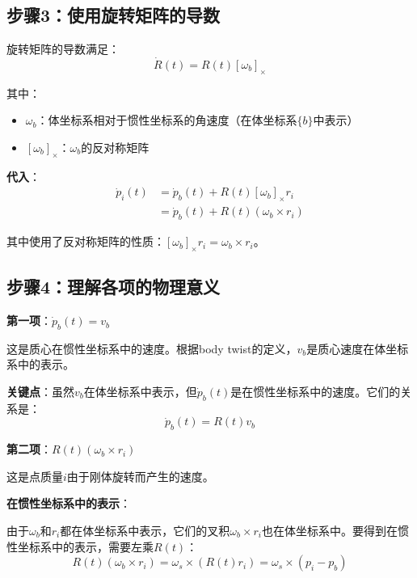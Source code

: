 \documentclass[12pt,a4paper]{article}
\begin{document}
\subsection{步骤3：使用旋转矩阵的导数}

旋转矩阵的导数满足：
\begin{equation}
\dot{R}(t) = R(t) [\omega_b]_{\times}
\label{eq:rotation_derivative}
\end{equation}

其中：
\begin{itemize}
\item $\omega_b$：体坐标系相对于惯性坐标系的角速度（在体坐标系$\{b\}$中表示）
\item $[\omega_b]_{\times}$：$\omega_b$的反对称矩阵
\end{itemize}

\textbf{代入}：
\begin{align}
\dot{p}_i(t) &= \dot{p}_b(t) + R(t) [\omega_b]_{\times} r_i \\
&= \dot{p}_b(t) + R(t) (\omega_b \times r_i)
\label{eq:derivative_step3}
\end{align}

其中使用了反对称矩阵的性质：$[\omega_b]_{\times} r_i = \omega_b \times r_i$。

\subsection{步骤4：理解各项的物理意义}

\textbf{第一项}：$\dot{p}_b(t) = v_b$

这是质心在惯性坐标系中的速度。根据body twist的定义，$v_b$是质心速度在体坐标系中的表示。

\textbf{关键点}：虽然$v_b$在体坐标系中表示，但$\dot{p}_b(t)$是在惯性坐标系中的速度。它们的关系是：
\begin{equation}
\dot{p}_b(t) = R(t) v_b
\end{equation}

\textbf{第二项}：$R(t) (\omega_b \times r_i)$

这是点质量$i$由于刚体旋转而产生的速度。

\textbf{在惯性坐标系中的表示}：

由于$\omega_b$和$r_i$都在体坐标系中表示，它们的叉积$\omega_b \times r_i$也在体坐标系中。要得到在惯性坐标系中的表示，需要左乘$R(t)$：
\begin{equation}
R(t) (\omega_b \times r_i) = \omega_s \times (R(t) r_i) = \omega_s \times (p_i - p_b)
\end{equation}
\end{document}
